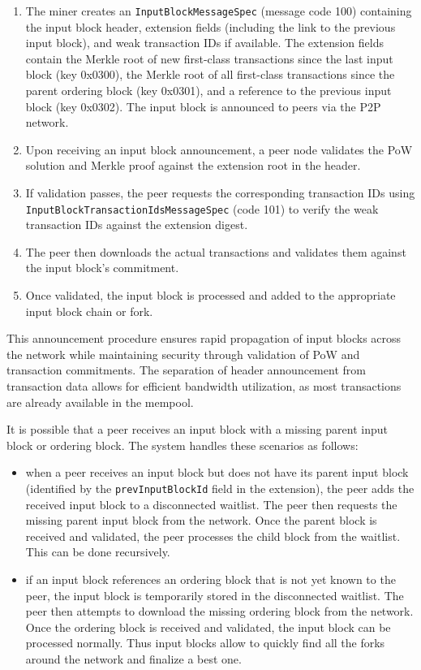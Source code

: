 \documentclass{llncs}
\newcommand{\code}[1]{\texttt{#1}}
\begin{document}
\begin{enumerate}
\item The miner creates an \code{InputBlockMessageSpec} (message code 100) containing the input block header, extension fields (including the link to the previous input block), and weak transaction IDs if available.
The extension fields contain the Merkle root of new first-class transactions since the last input block (key 0x0300), the Merkle root of all first-class transactions since the parent ordering block (key 0x0301), and a reference to the previous input block (key 0x0302).
The input block is announced to peers via the P2P network.

\item Upon receiving an input block announcement, a peer node validates the PoW solution and Merkle proof against the extension root in the header.

\item If validation passes, the peer requests the corresponding transaction IDs using \code{InputBlockTransactionIdsMessageSpec} (code 101) to verify the weak transaction IDs against the extension digest.

\item The peer then downloads the actual transactions and validates them against the input block's commitment.

\item Once validated, the input block is processed and added to the appropriate input block chain or fork.
\end{enumerate}

This announcement procedure ensures rapid propagation of input blocks across the network while maintaining security through validation of PoW and transaction commitments. The separation of header announcement from transaction data allows for efficient bandwidth utilization, as most transactions are already available in the mempool.

It is possible that a peer receives an input block with a missing parent input block or ordering block. The system handles these scenarios as follows:

\begin{itemize}
\item{} when a peer receives an input block but does not have its parent input block (identified by the \texttt{prevInputBlockId} field in the extension), the peer adds the received input block to a disconnected waitlist. The peer then requests the missing parent input block from the network. Once the parent block is received and validated, the peer processes the child block from the waitlist. This can be done
recursively.

\item{} if an input block references an ordering block that is not yet known to the peer, the input block is temporarily stored in the disconnected waitlist. The peer then attempts to download the missing ordering block from the network. Once the ordering block is received and validated, the input block can be processed normally. Thus input blocks
allow to quickly find all the forks around the network and finalize a best one.

\end{itemize}
\end{document}
